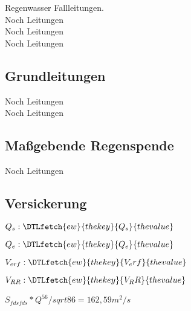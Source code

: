 \documentclass[12pt]{report}
\newcommand{\var}[1]{\DTLfetch{ew}{thekey}{#1}{thevalue}}
\begin{document}
Regenwasser Fallleitungen.\\
Noch Leitungen\\
Noch Leitungen\\
Noch Leitungen\\

\subsection*{Grundleitungen}

Noch Leitungen\\
Noch Leitungen\\

\subsection*{Maßgebende Regenspende}

Noch Leitungen\\

\subsection*{Versickerung}

$Q{_s}: \var{Q_s}$ 

$Q{_e}: \var{Q_e}$

$V_{erf}: \var{V_erf}$

$V_{RR}: \var{V_RR}$

$S_{fdsfds} * Q^56 / sqrt{86} = 162,59 m^2/s  $
\end{document}
